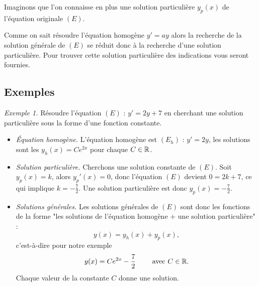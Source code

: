 \documentclass[11pt,class=report,crop=false]{standalone}
\begin{document}
Imaginons que l'on connaisse en plus une solution particulière $y_p(x)$ de l'équation originale $(E)$.






Comme on sait résoudre l'équation homogène $y'=ay$ alors la recherche de la solution générale de $(E)$ se réduit donc à la recherche d'une solution particulière.
Pour trouver cette solution particulière des indications vous seront fournies.



\subsection*{Exemples}

\emph{Exemple 1.}
Résoudre l'équation $(E)$ : $y' = 2y + 7$ en cherchant une solution particulière sous la forme d'une fonction constante.
\begin{itemize}
  \item \emph{\'Equation homogène.} L'équation homogène est $(E_h)$ : $y'=2y$, les solutions sont les $y_h(x) = Ce^{2x}$ pour chaque $C \in \mathbb{R}$.

  \item \emph{Solution particulière.} Cherchons une solution constante de $(E)$. Soit $y_p(x)=k$, alors $y_p'(x) = 0$, donc l'équation $(E)$ devient $0=2k+7$, ce qui implique $k=-\frac72$. Une solution particulière est donc $y_p(x)=-\frac72$.

  \item \emph{Solutions générales.} Les solutions générales de $(E)$ sont donc  les fonctions de la forme "les solutions de l'équation homogène + une solution particulière" :
$$y(x) = y_h(x) + y_p(x),$$
c'est-à-dire pour notre exemple
$$y(x) = Ce^{2x} - \frac72 \qquad \text{ avec } C \in \mathbb{R}.$$
Chaque valeur de la constante $C$ donne une solution.
\end{itemize}

\bigskip
\end{document}
